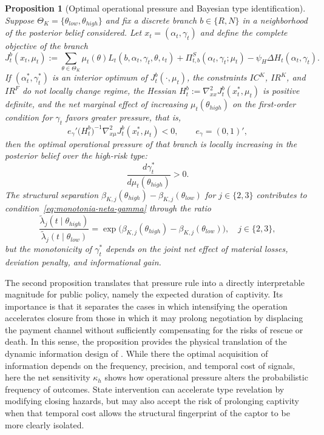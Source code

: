 \documentclass[pdflatex,sn-mathphys-ay]{sn-jnl}
\theoremstyle{plain}
\newtheorem{proposition}[theorem]{Proposition}
\theoremstyle{definition}
\newcommand{\ThetaK}{\Theta_K}
\newcommand{\1}{\mathbf{1}}
\begin{document}
\begin{proposition}[Optimal operational pressure and Bayesian type identification]
\label{prop:optimal-gamma-beliefs}
Suppose $\ThetaK=\{\theta_{low},\theta_{high}\}$ and fix a discrete branch $b\in\{R,N\}$ in a neighborhood of the posterior belief considered. Let $x_t=(\alpha_t,\gamma_t)$ and define the complete objective of the branch
\begin{equation}
\label{eq:obj-rama-completo}
J_t^b(x_t,\mu_t)
:=
\sum_{\theta\in\ThetaK}\mu_t(\theta)L_t(b,\alpha_t,\gamma_t,\theta,\iota_t)
+\Pi_{t,b}^{S}(\alpha_t,\gamma_t;\mu_t)
-\psi_H\Delta H_t(\alpha_t,\gamma_t).
\end{equation}
If $(\alpha_t^\ast,\gamma_t^\ast)$ is an interior optimum of $J_t^b(\cdot,\mu_t)$, the constraints $IC^K$, $IR^K$, and $IR^F$ do not locally change regime, the Hessian $H_t^b:=\nabla_{xx}^2J_t^b(x_t^\ast,\mu_t)$ is positive definite, and the net marginal effect of increasing $\mu_t(\theta_{high})$ on the first-order condition for $\gamma_t$ favors greater pressure, that is,
\begin{equation}
\label{eq:monotonia-neta-gamma}
e_\gamma'
\bigl(H_t^b\bigr)^{-1}
\nabla_{x\mu}^2J_t^b(x_t^\ast,\mu_t)
<0,
\qquad
e_\gamma=(0,1)',
\end{equation}
then the optimal operational pressure of that branch is locally increasing in the posterior belief over the high-risk type:
\[
\frac{d\gamma_t^\ast}{d\mu_t(\theta_{high})} > 0.
\]
The structural separation $\beta_{K,j}(\theta_{high})-\beta_{K,j}(\theta_{low})$ for $j\in\{2,3\}$ contributes to condition~\eqref{eq:monotonia-neta-gamma} through the ratio
\[
\frac{\tilde\lambda_j(t\mid\theta_{high})}{\tilde\lambda_j(t\mid\theta_{low})}
=\exp\!\bigl(\beta_{K,j}(\theta_{high})-\beta_{K,j}(\theta_{low})\bigr),
\quad j\in\{2,3\},
\]
but the monotonicity of $\gamma_t^\ast$ depends on the joint net effect of material losses, deviation penalty, and informational gain.
\end{proposition}

\noindent The second proposition translates that pressure rule into a directly interpretable magnitude for public policy, namely the expected duration of captivity. Its importance is that it separates the cases in which intensifying the operation accelerates closure from those in which it may prolong negotiation by displacing the payment channel without sufficiently compensating for the risks of rescue or death. In this sense, the proposition provides the physical translation of the dynamic information design of \citet{Zhong2022}. While there the optimal acquisition of information depends on the frequency, precision, and temporal cost of signals, here the net sensitivity $\kappa_h$ shows how operational pressure alters the probabilistic frequency of outcomes. State intervention can accelerate type revelation by modifying closing hazards, but may also accept the risk of prolonging captivity when that temporal cost allows the structural fingerprint of the captor to be more clearly isolated.
\end{document}
